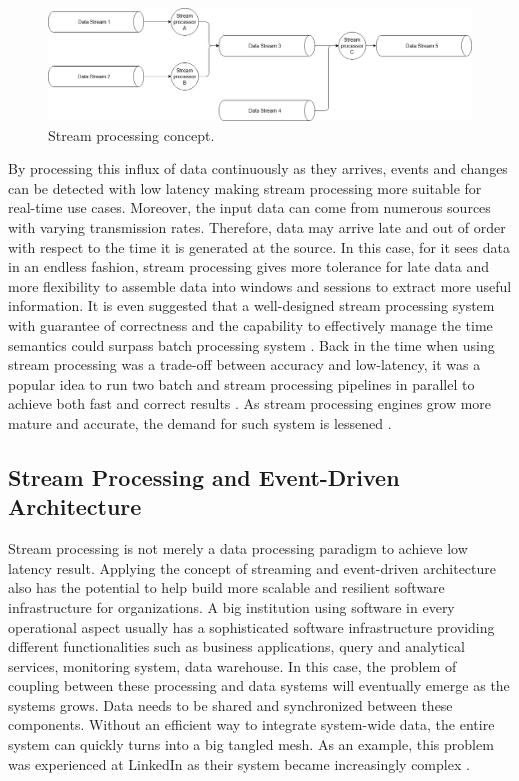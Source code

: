 \begin{figure}[h]
	\includegraphics[width=\linewidth]{images/streamprocessing.png}
	\caption{Stream processing concept.}
	\label{fig:streamprocessing}
\end{figure}


By processing this influx of data continuously as they arrives, events and changes can be detected with low latency making stream processing more suitable for real-time use cases. Moreover, the input data can come from numerous sources with varying transmission rates. Therefore, data may arrive late and out of order with respect to the time it is generated at the source. In this case, for it sees data in an endless fashion, stream processing gives more tolerance for late data and more flexibility to assemble data into windows and sessions to extract more useful information. It is even suggested that a well-designed stream processing system with guarantee of correctness and the capability to effectively manage the time semantics could surpass batch processing system \cite{stream101}. Back in the time when using stream processing was a trade-off between accuracy and low-latency, it was a popular idea to run two batch and stream processing pipelines in parallel to achieve both fast and correct results \cite{questionlambdaarchitecture}. As stream processing engines grow more mature and accurate, the demand for such system is lessened .
\subsection{Stream Processing and Event-Driven Architecture}
Stream processing is not merely a data processing paradigm to achieve low latency result. Applying the concept of streaming and event-driven architecture also has the potential to help build more scalable and resilient software infrastructure for organizations. A big institution using software in every operational aspect usually has a sophisticated software infrastructure providing different functionalities such as business applications, query and analytical services, monitoring system, data warehouse. In this case, the problem of coupling between these processing and data systems will eventually emerge as the systems grows. Data needs to be shared and synchronized between these components. Without an efficient way to integrate system-wide data, the entire system can quickly turns into a big tangled mesh. As an example, this problem was experienced at LinkedIn as their system became increasingly complex \cite{eventstreamingplatform}. 

